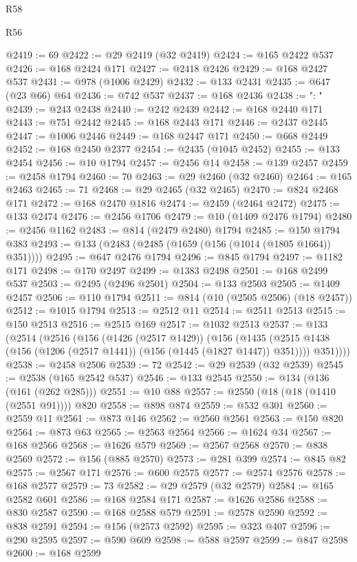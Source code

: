 \begin{lexlean}{R58}
\begin{lexlean}{R56}
\begin{coremodule}
{{{{{{{{{{{{{{{{{{{{{{{{{{{{{{{{{{{{{{{{{{{{{{{{{{{{{{{{{{{{{{{{{{{{{{{{{{{{{{{{{{{{{{{{{{{{{{{{{{{{{{{{{{{{{{{{{{{{{{{{{{{{{{{{{{{{{{{{{{{{{{{{{{{{{{{{{{{{{{{{{{{{{{{{{{{{{{{{{{{{{{{{{{{{{{{{{{{{{{{{{{{{{{{{{{{@2419 := 69
@2422 := @29 @2419 (@32 @2419)
@2424 := @165 @2422 @537
@2426 := @168 @2424 @171
@2427 := @2418 @2426
@2429 := @168 @2427 @537
@2431 := @978 (@1006 @2429)
@2432 := @133 @2431
@2435 := @647 (@23 @66) @64
@2436 := @742 @537
@2437 := @168 @2436
@2438 := ": "
@2439 := @243 @2438
@2440 := @242 @2439
@2442 := @168 @2440 @171
@2443 := @751 @2442
@2445 := @168 @2443 @171
@2446 := @2437 @2445
@2447 := @1006 @2446
@2449 := @168 @2447 @171
@2450 := @668 @2449
@2452 := @168 @2450 @2377
@2454 := @2435 (@1045 @2452)
@2455 := @133 @2454
@2456 := @10 @1794
@2457 := @2456 @14
@2458 := @139 @2457
@2459 := @2458 @1794
@2460 := 70
@2463 := @29 @2460 (@32 @2460)
@2464 := @165 @2463
@2465 := 71
@2468 := @29 @2465 (@32 @2465)
@2470 := @824 @2468 @171
@2472 := @168 @2470 @1816
@2474 := @2459 (@2464 @2472)
@2475 := @133 @2474
@2476 := @2456 @1706
@2479 := @10 (@1409 @2476 @1794)
@2480 := @2456 @1162
@2483 := @814 (@2479 @2480) @1794
@2485 := @150 @1794 @383
@2493 := @133 (@2483 (@2485 (@1659 (@156 (@1014 (@1805 @1664)) @351))))
@2495 := @647 @2476 @1794
@2496 := @845 @1794
@2497 := @1182 @171
@2498 := @170 @2497
@2499 := @1383 @2498
@2501 := @168 @2499 @537
@2503 := @2495 (@2496 @2501)
@2504 := @133 @2503
@2505 := @1409 @2457
@2506 := @110 @1794
@2511 := @814 (@10 (@2505 @2506) (@18 @2457))
@2512 := @1015 @1794
@2513 := @2512 @11
@2514 := @2511 @2513
@2515 := @150 @2513
@2516 := @2515 @169
@2517 := @1032 @2513
@2537 := @133
    (@2514
      (@2516
        (@156
          (@1426 (@2517 @1429))
          (@156
            (@1435 (@2515 @1438 (@156 (@1206 (@2517 @1441)) (@156 (@1445 (@1827 @1447)) @351))))
            @351))))
@2538 := @2458 @2506
@2539 := 72
@2542 := @29 @2539 (@32 @2539)
@2545 := @2538 (@165 @2542 @537)
@2546 := @133 @2545
@2550 := @134 (@136 (@161 (@262 @285)))
@2551 := @10 @88
@2557 := @2550 (@18 (@18 (@1410 (@2551 @91)))) @820
@2558 := @898 @874
@2559 := @532 @301
@2560 := @2559 @11
@2561 := @873 @146
@2562 := @2560 @2561
@2563 := @150 @820
@2564 := @873 @63
@2565 := @2563 @2564
@2566 := @1624 @34
@2567 := @168 @2566
@2568 := @1626 @579
@2569 := @2567 @2568
@2570 := @838 @2569
@2572 := @156 (@885 @2570)
@2573 := @281 @399
@2574 := @845 @82
@2575 := @2567 @171
@2576 := @600 @2575
@2577 := @2574 @2576
@2578 := @168 @2577
@2579 := 73
@2582 := @29 @2579 (@32 @2579)
@2584 := @165 @2582 @601
@2586 := @168 @2584 @171
@2587 := @1626 @2586
@2588 := @830 @2587
@2590 := @168 @2588 @579
@2591 := @2578 @2590
@2592 := @838 @2591
@2594 := @156 (@2573 @2592)
@2595 := @323 @407
@2596 := @290 @2595
@2597 := @590 @609
@2598 := @588 @2597
@2599 := @847 @2598
@2600 := @168 @2599
}}}}}}}}}}}}}}}}}}}}}}}}}}}}}}}}}}}}}}}}}}}}}}}}}}}}}}}}}}}}}}}}}}}}}}}}}}}}}}}}}}}}}}}}}}}}}}}}}}}}}}}}}}}}}}}}}}}}}}}}}}}}}}}}}}}}}}}}}}}}}}}}}}}}}}}}}}}}}}}}}}}}}}}}}}}}}}}}}}}}}}}}}}}}}}}}}}}}}}}}}}}}}}}}}}}
\end{coremodule}
\end{lexlean}
\end{lexlean}

